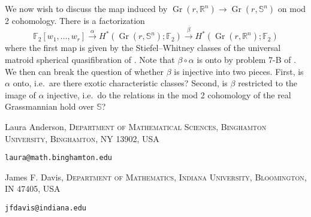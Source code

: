 \documentclass[10pt, preprint]{article}
\makeatletter
\theoremstyle{definition}
\newcommand{\Addresses}{{%
  \bigskip
  \footnotesize

  Laura Anderson, \textsc{Department of Mathematical Sciences, Binghamton University,
    Binghamton, NY 13902, USA}\par\nopagebreak
\texttt{laura@math.binghamton.edu}
    \bigskip

    James F. Davis, \textsc{Department of Mathematics, Indiana University,
    Bloomington, IN 47405, USA}\par\nopagebreak
  \texttt{jfdavis@indiana.edu}
  }}
\makeatother
\begin{document}
We now wish to discuss the map induced by $ \operatorname{Gr}(r,
\mathbb{R}^{n}) \to \operatorname{Gr}(r,\mathbb{S}^{n})$ on mod 2
cohomology. There is a factorization
%
\begin{equation*}
\mathbb{F}_{2}[w_{1}, \dots , w_{r}] \xrightarrow{\alpha } H^{*}(
\operatorname{Gr}(r,\mathbb{S}^{n});\mathbb{F}_{2})
\xrightarrow{\beta } H^{*}(\operatorname{Gr}(r,\mathbb{R}^{n});
\mathbb{F}_{2})
\end{equation*}
%
where the first map is given by the Stiefel--Whitney classes of the
universal matroid spherical quasifibration of
\cite{Anderson-Davis}. Note that $\beta \circ \alpha $ is onto by
problem 7-B of \cite{Milnor-Stasheff}. We then can break the
question of whether $\beta $ is injective into two pieces. First, is
$\alpha $ onto, i.e.~are there exotic characteristic classes? Second,
is $\beta $ restricted to the image of $\alpha $ injective, i.e.~do the
relations in the mod 2 cohomology of the real Grassmannian hold over
$\mathbb{S}$?




\Addresses
\end{document}
